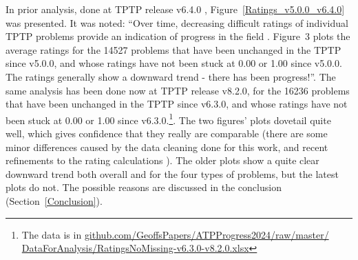 \documentclass[runningheads]{llncs}
\begin{document}
In prior analysis, done at TPTP release v6.4.0 \cite{Sut17}, Figure~\ref{Ratings_v5.0.0_v6.4.0} 
was presented. 
It was noted: ``Over time, decreasing difficult ratings of individual TPTP problems provide an 
indication of progress in the field \cite{SFS01}. Figure~3 plots the average ratings for the 
14527 problems that have been unchanged in the TPTP since v5.0.0, and whose ratings have not 
been stuck at 0.00 or 1.00 since v5.0.0. The ratings generally show a downward trend - there 
has been progress!''.
The same analysis has been done now at TPTP release v8.2.0, for the 16236 problems that have been 
unchanged in the TPTP since v6.3.0, and whose ratings have not been stuck at 0.00 or 1.00 since 
v6.3.0.\footnote{%
The data is in \href{https://github.com/GeoffsPapers/ATPProgress2024/raw/master/DataForAnalysis/RatingsNoMissing-v6.3.0-v8.2.0.xlsx}{github.com/GeoffsPapers/ATPProgress2024/raw/master/} 
\href{https://github.com/GeoffsPapers/ATPProgress2024/raw/master/DataForAnalysis/RatingsNoMissing-v6.3.0-v8.2.0.xlsx}{DataForAnalysis/RatingsNoMissing-v6.3.0-v8.2.0.xlsx}}.
The two figures' plots dovetail quite well, which gives confidence that they really are comparable
(there are some minor differences caused by the data cleaning done for this work, and recent 
refinements to the rating calculations \cite{SD23-CASC,SD24-CASC}).
The older plots show a quite clear downward trend both overall and for the four types of problems,
but the latest plots do not.
The possible reasons are discussed in the conclusion (Section~\ref{Conclusion}).
\end{document}
